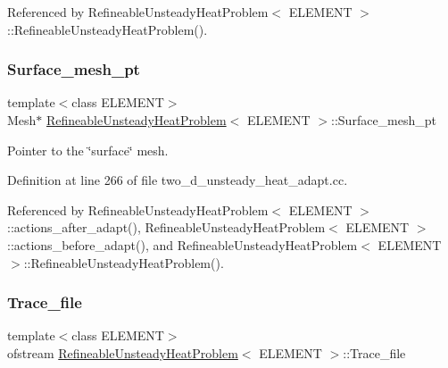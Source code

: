 Referenced by Refineable\+Unsteady\+Heat\+Problem$<$ E\+L\+E\+M\+E\+N\+T $>$\+::\+Refineable\+Unsteady\+Heat\+Problem().

\mbox{\label{classRefineableUnsteadyHeatProblem_a2febbb317a74e427bf6304235d779fe6}} 
\subsubsection{\texorpdfstring{Surface\+\_\+mesh\+\_\+pt}{Surface\_mesh\_pt}}
{\footnotesize\ttfamily template$<$class E\+L\+E\+M\+E\+NT$>$ \\
Mesh$\ast$ \hyperlink{classRefineableUnsteadyHeatProblem}{Refineable\+Unsteady\+Heat\+Problem}$<$ E\+L\+E\+M\+E\+NT $>$\+::Surface\+\_\+mesh\+\_\+pt\hspace{0.3cm}{\ttfamily [private]}}



Pointer to the \char`\"{}surface\char`\"{} mesh. 



Definition at line 266 of file two\+\_\+d\+\_\+unsteady\+\_\+heat\+\_\+adapt.\+cc.



Referenced by Refineable\+Unsteady\+Heat\+Problem$<$ E\+L\+E\+M\+E\+N\+T $>$\+::actions\+\_\+after\+\_\+adapt(), Refineable\+Unsteady\+Heat\+Problem$<$ E\+L\+E\+M\+E\+N\+T $>$\+::actions\+\_\+before\+\_\+adapt(), and Refineable\+Unsteady\+Heat\+Problem$<$ E\+L\+E\+M\+E\+N\+T $>$\+::\+Refineable\+Unsteady\+Heat\+Problem().

\mbox{\label{classRefineableUnsteadyHeatProblem_a8f62ba78fb856d2e07b00254ca7a0e6a}} 
\subsubsection{\texorpdfstring{Trace\+\_\+file}{Trace\_file}}
{\footnotesize\ttfamily template$<$class E\+L\+E\+M\+E\+NT$>$ \\
ofstream \hyperlink{classRefineableUnsteadyHeatProblem}{Refineable\+Unsteady\+Heat\+Problem}$<$ E\+L\+E\+M\+E\+NT $>$\+::Trace\+\_\+file\hspace{0.3cm}{\ttfamily [private]}}



